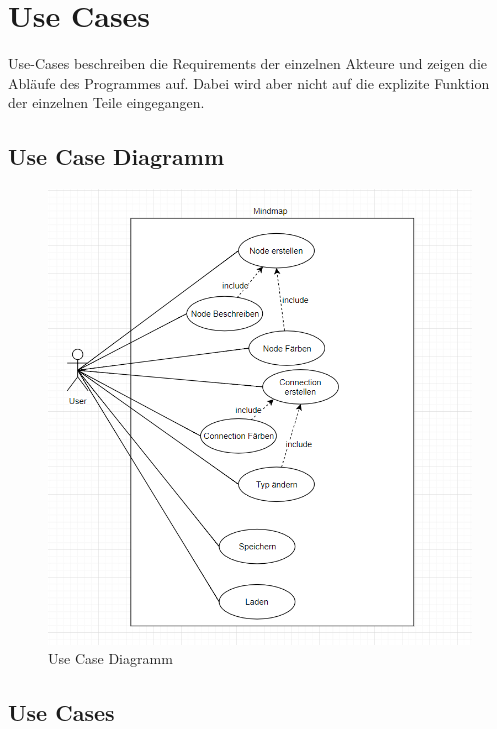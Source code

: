 \section{Use Cases}
\label{sec:use_cases}
Use-Cases beschreiben die Requirements der einzelnen Akteure und zeigen die Abläufe des Programmes auf. Dabei wird aber nicht auf die explizite Funktion der einzelnen Teile eingegangen.

\subsection{Use Case Diagramm}
\label{subsec:use_case_diagramm}

\begin{figure}[H]
	\centering
		\includegraphics[scale=0.7]{images/UseCaseDiagram.PNG}
	\caption{Use Case Diagramm}
	\label{fig:use_case_diagramm}
\end{figure}

\subsection{Use Cases}
\label{subsec:use_cases}

